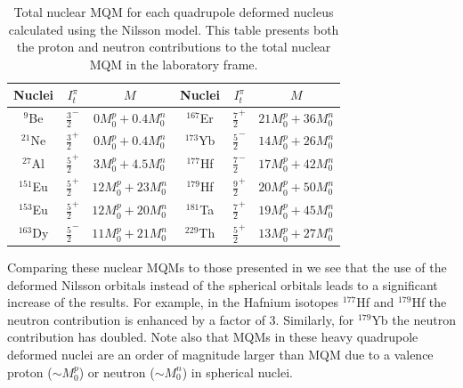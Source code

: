 \documentclass[8pt,a4paper, twoside]{report}
\begin{document}
\begin{table}
\label{table:NuclearMQM}
\begin{tabular}{ccc|ccc}
\toprule
\toprule
\parbox{1.5cm}{Nuclei}   & $I_t^{\pi}$ &  $M$ & \parbox{1.5cm}{Nuclei} & $I_t^{\pi}$ & $M$ \\
\midrule
$^9$Be     & $\tfrac{3}{2}^-$ & $0M_{0}^{p} + 0.4M_{0}^{n}$ &  $^{167}$Er & $\tfrac{7}{2}^+$ & $21M_{0}^{p} +36M_{0}^{n}$\\[5pt]
$^{21}$Ne  & $\tfrac{3}{2}^+$ & $0M_{0}^{p} + 0.4M_{0}^{n}$ &  $^{173}$Yb & $\tfrac{5}{2}^-$ & $14M_{0}^{p} +26M_{0}^{n}$\\[5pt]
$^{27}$Al  & $\tfrac{5}{2}^+$ & $3M_{0}^{p} + 4.5M_{0}^{n}$ &  $^{177}$Hf & $\tfrac{7}{2}^-$ & $17M_{0}^{p} +42M_{0}^{n}$\\[5pt]
$^{151}$Eu & $\tfrac{5}{2}^+$ & $12M_{0}^{p} + 23M_{0}^{n}$   &  $^{179}$Hf & $\tfrac{9}{2}^+$ & $20M_{0}^{p} + 50M_{0}^{n}$\\[5pt]
$^{153}$Eu & $\tfrac{5}{2}^+$ & $12M_{0}^{p} + 20M_{0}^{n}$   &  $^{181}$Ta & $\tfrac{7}{2}^+$ & $19M_{0}^{p} + 45M_{0}^{n}$\\[5pt]
$^{163}$Dy & $\tfrac{5}{2}^-$ & $11M_{0}^{p} + 21M_{0}^{n}$  &  $^{229}$Th & $\tfrac{5}{2}^+$ & $13M_{0}^{p} + 27M_{0}^{n}$\\[5pt]
\bottomrule
\bottomrule
\end{tabular}
\caption{Total nuclear MQM for each quadrupole deformed nucleus calculated  using the Nilsson model. This table presents both the proton and neutron contributions to the total nuclear MQM in the laboratory frame. }
\end{table}

Comparing these nuclear MQMs to those presented in \cite{Flambaum2014} we see that the use of the deformed Nilsson orbitals instead of the spherical orbitals leads to a  significant increase of the results. For example, in the Hafnium isotopes $^{177}$Hf and  $^{179}$Hf the neutron contribution is enhanced by a factor of 3.  Similarly, for $^{179}$Yb the neutron contribution has doubled.  Note also that  MQMs in these heavy quadrupole deformed nuclei are an order of magnitude larger than MQM due to a valence proton   ($ \sim M_{0}^{p}$)  or neutron  ($\sim M_{0}^{n}$) in spherical nuclei.
\end{document}
